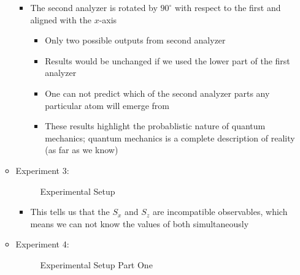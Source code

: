 \begin{itemize}
\begin{itemize}
        \begin{itemize}

          \item The second analyzer is rotated by $90^{\circ}$ with respect to the first and aligned with the $x$-axis

            \begin{itemize}

              \item Only two possible outputs from second analyzer

              \item Results would be unchanged if we used the lower part of the first analyzer

              \item One can not predict which of the second analyzer parts any particular atom will emerge from

              \item These results highlight the probablistic nature of quantum mechanics; quantum mechanics is a complete description of reality (as far as we know)

            \end{itemize}

        \end{itemize}

      \item Experiment 3:

        \begin{figure}[H]
          \centering
          
          \caption{Experimental Setup}
          \label{fig:4}
        \end{figure}
    
        \begin{itemize}

          \item This tells us that the $S_x$ and $S_z$ are incompatible observables, which means we can not know the values of both simultaneously

        \end{itemize}

      \item Experiment 4:

        \begin{figure}[H]
          \centering
          
          \caption{Experimental Setup Part One}
          \label{fig:5}
        \end{figure}


\end{itemize}
\end{itemize}
